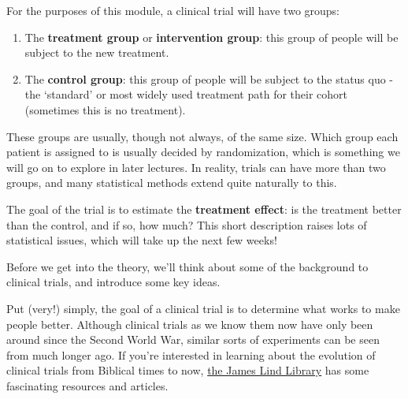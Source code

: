 \documentclass[
  openany]{book}
\providecommand{\tightlist}{%
  \setlength{\itemsep}{0pt}\setlength{\parskip}{0pt}}
\theoremstyle{definition}
\theoremstyle{definition}
\theoremstyle{definition}
\theoremstyle{definition}
\theoremstyle{remark}
\begin{document}
For the purposes of this module, a clinical trial will have two groups:

\begin{enumerate}
\def\labelenumi{\arabic{enumi}.}
\tightlist
\item
  The \textbf{treatment group} or \textbf{intervention group}: this group of people will be subject to the new treatment.
\item
  The \textbf{control group}: this group of people will be subject to the status quo - the `standard' or most widely used treatment path for their cohort (sometimes this is no treatment).
\end{enumerate}

These groups are usually, though not always, of the same size. Which group each patient is assigned to is usually decided by randomization, which is something we will go on to explore in later lectures. In reality, trials can have more than two groups, and many statistical methods extend quite naturally to this.

The goal of the trial is to estimate the \textbf{treatment effect}: is the treatment better than the control, and if so, how much? This short description raises lots of statistical issues, which will take up the next few weeks!

Before we get into the theory, we'll think about some of the background to clinical trials, and introduce some key ideas.

Put (very!) simply, the goal of a clinical trial is to determine what works to make people better. Although clinical trials as we know them now have only been around since the Second World War, similar sorts of experiments can be seen from much longer ago. If you're interested in learning about the evolution of clinical trials from Biblical times to now, \href{https://www.jameslindlibrary.org/}{the James Lind Library} has some fascinating resources and articles.
\end{document}
